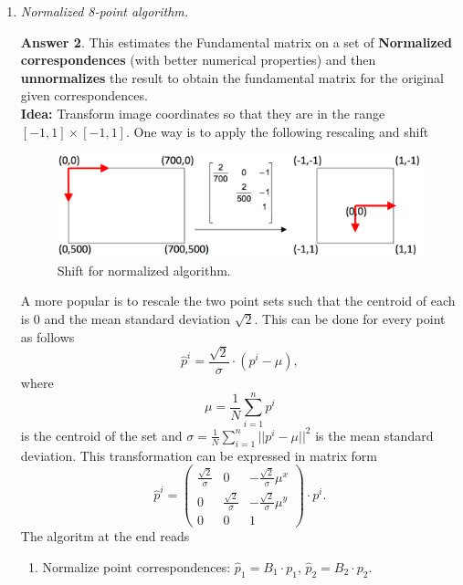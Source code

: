 \documentclass[a4paper,12 pt]{article}
\theoremstyle{definition}
\theoremstyle{remark}
\theoremstyle{definition}
\theoremstyle{definition}
\theoremstyle{definition}
\theoremstyle{definition}
\theoremstyle{remark}
\theoremstyle{remark}
\theoremstyle{definition}
\theoremstyle{definition}
\newtheorem*{answer}{Answer}
\begin{document}
\begin{enumerate}
\begin{answer}
\end{answer}
\item \textit{Normalized 8-point algorithm.}
\begin{answer}
This estimates the Fundamental matrix on a set of \textbf{Normalized correspondences} (with better numerical properties) and then \textbf{unnormalizes} the result to obtain the fundamental matrix for the original given correspondences. \\
\textbf{Idea:} Transform image coordinates so that they are in the range $[-1,1]\times [-1,1]$. One way is to apply the following rescaling and shift
\begin{figure}[h!]
\begin{center}
\includegraphics[scale=0.3]{pics/shift}
\caption{Shift for normalized algorithm. \label{fig:shift}}
\end{center}
\end{figure}
A more popular is to rescale the two point sets such that the centroid of each is 0 and the mean standard deviation $\sqrt{2}$. This can be done for every point as follows
\begin{equation}
\hat{p}^i=\frac{\sqrt{2}}{\sigma}\cdot (p^i-\mu),
\end{equation}
where
\begin{equation}
\mu=\frac{1}{N}\sum_{i=1}^n p^i
\end{equation}
is the centroid of the set and $\sigma=\frac{1}{N}\sum_{i=1}^n ||p^i-\mu||^2$ is the mean standard deviation. This transformation can be expressed in matrix form
\begin{equation}
\hat{p}^i=\begin{pmatrix}
\frac{\sqrt{2}}{\sigma}&0&-\frac{\sqrt{2}}{\sigma}\mu^x\\
0&\frac{\sqrt{2}}{\sigma}&-\frac{\sqrt{2}}{\sigma}\mu^y\\
0&0&1
\end{pmatrix}\cdot p^i.
\end{equation}
The algoritm at the end reads
\begin{enumerate}
\item Normalize point correspondences: $\hat{p}_1=B_1\cdot p_1$, $\hat{p}_2=B_2\cdot p_2$.

\end{enumerate}
\end{answer}
\end{enumerate}
\end{document}
